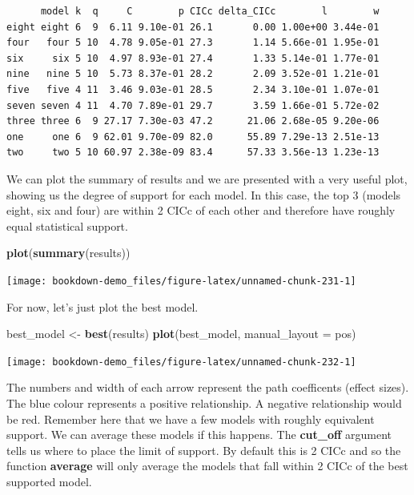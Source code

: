 \documentclass[
]{book}
\newenvironment{Shaded}{\begin{snugshade}}{\end{snugshade}}
\newcommand{\DataTypeTok}[1]{\textcolor[rgb]{0.13,0.29,0.53}{#1}}
\newcommand{\KeywordTok}[1]{\textcolor[rgb]{0.13,0.29,0.53}{\textbf{#1}}}
\newcommand{\NormalTok}[1]{#1}
\newcommand{\StringTok}[1]{\textcolor[rgb]{0.31,0.60,0.02}{#1}}
\begin{document}
\begin{verbatim}
      model k  q     C        p CICc delta_CICc        l        w
eight eight 6  9  6.11 9.10e-01 26.1       0.00 1.00e+00 3.44e-01
four   four 5 10  4.78 9.05e-01 27.3       1.14 5.66e-01 1.95e-01
six     six 5 10  4.97 8.93e-01 27.4       1.33 5.14e-01 1.77e-01
nine   nine 5 10  5.73 8.37e-01 28.2       2.09 3.52e-01 1.21e-01
five   five 4 11  3.46 9.03e-01 28.5       2.34 3.10e-01 1.07e-01
seven seven 4 11  4.70 7.89e-01 29.7       3.59 1.66e-01 5.72e-02
three three 6  9 27.17 7.30e-03 47.2      21.06 2.68e-05 9.20e-06
one     one 6  9 62.01 9.70e-09 82.0      55.89 7.29e-13 2.51e-13
two     two 5 10 60.97 2.38e-09 83.4      57.33 3.56e-13 1.23e-13
\end{verbatim}

We can plot the summary of results and we are presented with a very useful plot, showing us the degree of support for each model. In this case, the top 3 (models eight, six and four) are within 2 CICc of each other and therefore have roughly equal statistical support.

\begin{Shaded}
\begin{Highlighting}[]
\KeywordTok{plot}\NormalTok{(}\KeywordTok{summary}\NormalTok{(results))}
\end{Highlighting}
\end{Shaded}

\begin{center}\texttt{[image: bookdown-demo\_files/figure-latex/unnamed-chunk-231-1]} \end{center}

For now, let's just plot the best model.

\begin{Shaded}
\begin{Highlighting}[]
\NormalTok{best\_model \textless{}{-}}\StringTok{ }\KeywordTok{best}\NormalTok{(results)}
\KeywordTok{plot}\NormalTok{(best\_model, }\DataTypeTok{manual\_layout =}\NormalTok{ pos)}
\end{Highlighting}
\end{Shaded}

\begin{center}\texttt{[image: bookdown-demo\_files/figure-latex/unnamed-chunk-232-1]} \end{center}

The numbers and width of each arrow represent the path coefficents (effect sizes). The blue colour represents a positive relationship. A negative relationship would be red. Remember here that we have a few models with roughly equivalent support. We can average these models if this happens. The \textbf{cut\_off} argument tells us where to place the limit of support. By default this is 2 CICc and so the function \textbf{average} will only average the models that fall within 2 CICc of the best supported model.
\end{document}
